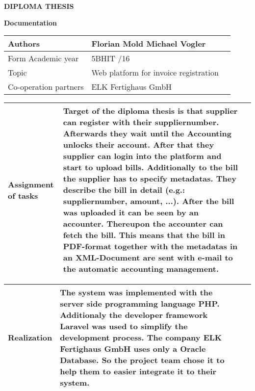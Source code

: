 \begin{center}
\textbf{\LARGE DIPLOMA THESIS}

\textbf{Documentation}
\end{center}

\begin{tabular}{|p{53mm}|p{110mm}|@{}m{0cm}@{}}
\hline
Authors  & Florian Mold \newline Michael Vogler & \\ [0.3cm]
\hline
Form \newline Academic year & 5BHIT \newline 2015/16 & \\ [0.3cm]
\hline
Topic & Web platform for invoice registration & \\ [0.3cm]
\hline
Co-operation partners & ELK Fertighaus GmbH & \\ [0.3cm]
\hline
\end{tabular}

\vspace{0.5cm}

\begin{tabular}{|p{53mm}|p{110mm}|@{}m{0cm}@{}}
\hline
Assignment of tasks & Target of the diploma thesis is that supplier can register with their suppliernumber. Afterwards they wait until the Accounting unlocks their account. After that they supplier can login into the platform and start to upload bills. Additionally to the bill the supplier has to specify metadatas. They describe the bill in detail (e.g.: suppliernumber, amount, ...). After the bill was uploaded it can be seen by an accounter. Thereupon the accounter can fetch the bill. This means that the bill in PDF-format together with the metadatas in an XML-Document are sent with e-mail to the automatic accounting management. & \\ 
\hline
\end{tabular}

\vspace{0.5cm}

\begin{tabular}{|p{53mm}|p{110mm}|@{}m{0cm}@{}}
\hline
Realization & The system was implemented with the server side programming language PHP. Additionaly the developer framework Laravel was used to simplify the development process. The company ELK Fertighaus GmbH uses only a Oracle Database. So the project team chose it to help them to easier integrate it to their system. & \\
\hline
\end{tabular}

